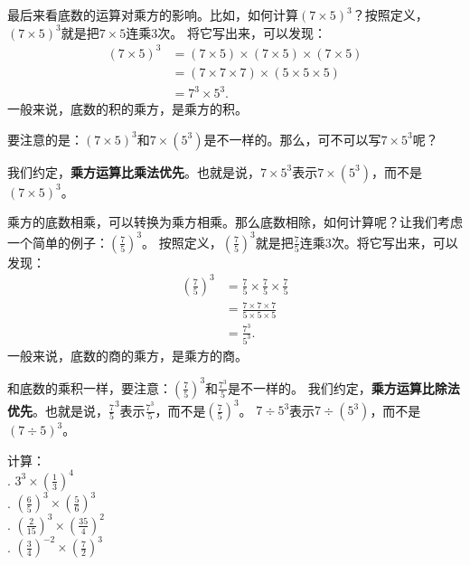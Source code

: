 \documentclass[12pt,UTF8,fontset=none]{ctexbook}
\begin{document}
最后来看底数的运算对乘方的影响。比如，如何计算$(7\times 5)^3$？按照定义，$(7\times 5)^3$就是把$7\times 5$连乘$3$次。
将它写出来，可以发现：
\begin{align*}
    (7\times 5)^3 &= (7\times 5) \times (7\times 5) \times (7\times 5) \\
    &= (7 \times 7 \times 7) \times (5 \times 5 \times 5) \\
    &= 7^3 \times 5^3.
\end{align*}
一般来说，底数的积的乘方，是乘方的积。

要注意的是：$(7\times 5)^3$和$7\times (5^3)$是不一样的。那么，可不可以写$7\times 5^3$呢？

我们约定，\textbf{乘方运算比乘法优先}。也就是说，$7\times 5^3$表示$7\times (5^3)$，而不是$(7\times 5)^3$。

乘方的底数相乘，可以转换为乘方相乘。那么底数相除，如何计算呢？让我们考虑一个简单的例子：$\left(\frac{7}{5}\right)^3$。
按照定义，$\left(\frac{7}{5}\right)^3$就是把$\frac{7}{5}$连乘$3$次。将它写出来，可以发现：
\begin{align*}
    \left(\frac{7}{5}\right)^3 &= \frac{7}{5} \times \frac{7}{5} \times \frac{7}{5} \\
    &= \frac{7\times 7\times 7}{5\times 5\times 5} \\
    &= \frac{7^3}{5^3}.
\end{align*}
一般来说，底数的商的乘方，是乘方的商。

和底数的乘积一样，要注意：$\left(\frac{7}{5}\right)^3$和$\frac{7^3}{5}$是不一样的。
我们约定，\textbf{乘方运算比除法优先}。也就是说，$\frac{7}{5}^3$表示$\frac{7^3}{5}$，而不是$\left(\frac{7}{5}\right)^3$。
$7\div 5^3$表示$7\div (5^3)$，而不是$(7\div 5)^3$。

\begin{et}
    计算：\\
    . $3^3 \times \left(\frac{1}{3}\right)^4$  \\
    . $\left(\frac{6}{5}\right)^3\times \left(\frac{5}{6}\right)^3$ \\
    . $\left(\frac{2}{15}\right)^3\times \left(\frac{35}{4}\right)^2$ \\
    . $\left(\frac{3}{4}\right)^{-2}\times \left(\frac{7}{2}\right)^3$ 
\end{et}
\end{document}
